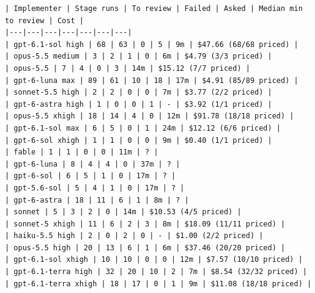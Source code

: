 \documentclass[11pt,a4paper]{article}
\begin{document}
{\tiny
\begin{verbatim}
| Implementer | Stage runs | To review | Failed | Asked | Median min to review | Cost |
|---|---|---|---|---|---|---|
| gpt-6.1-sol high | 68 | 63 | 0 | 5 | 9m | $47.66 (68/68 priced) |
| opus-5.5 medium | 3 | 2 | 1 | 0 | 6m | $4.79 (3/3 priced) |
| opus-5.5 | 7 | 4 | 0 | 3 | 14m | $15.12 (7/7 priced) |
| gpt-6-luna max | 89 | 61 | 10 | 18 | 17m | $4.91 (85/89 priced) |
| sonnet-5.5 high | 2 | 2 | 0 | 0 | 7m | $3.77 (2/2 priced) |
| gpt-6-astra high | 1 | 0 | 0 | 1 | - | $3.92 (1/1 priced) |
| opus-5.5 xhigh | 18 | 14 | 4 | 0 | 12m | $91.78 (18/18 priced) |
| gpt-6.1-sol max | 6 | 5 | 0 | 1 | 24m | $12.12 (6/6 priced) |
| gpt-6-sol xhigh | 1 | 1 | 0 | 0 | 9m | $0.40 (1/1 priced) |
| fable | 1 | 1 | 0 | 0 | 11m | ? |
| gpt-6-luna | 8 | 4 | 4 | 0 | 37m | ? |
| gpt-6-sol | 6 | 5 | 1 | 0 | 17m | ? |
| gpt-5.6-sol | 5 | 4 | 1 | 0 | 17m | ? |
| gpt-6-astra | 18 | 11 | 6 | 1 | 8m | ? |
| sonnet | 5 | 3 | 2 | 0 | 14m | $10.53 (4/5 priced) |
| sonnet-5 xhigh | 11 | 6 | 2 | 3 | 8m | $18.09 (11/11 priced) |
| haiku-5.5 high | 2 | 0 | 2 | 0 | - | $1.00 (2/2 priced) |
| opus-5.5 high | 20 | 13 | 6 | 1 | 6m | $37.46 (20/20 priced) |
| gpt-6.1-sol xhigh | 10 | 10 | 0 | 0 | 12m | $7.57 (10/10 priced) |
| gpt-6.1-terra high | 32 | 20 | 10 | 2 | 7m | $8.54 (32/32 priced) |
| gpt-6.1-terra xhigh | 18 | 17 | 0 | 1 | 9m | $11.08 (18/18 priced) |


\end{verbatim}}
\end{document}
